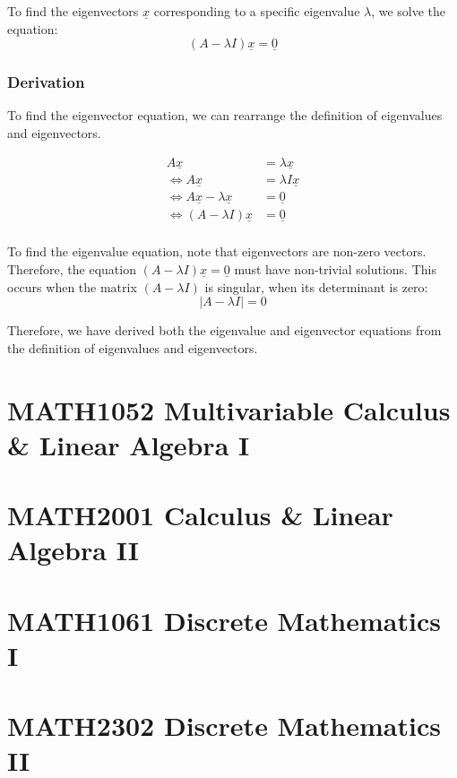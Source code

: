 \documentclass[12pt, letterpaper]{book}
\begin{document}
To find the eigenvectors $\underline{x}$ corresponding to a specific eigenvalue $\lambda$, we solve the equation:
$$(A - \lambda I) \underline{x} = \underline{0}$$

\section{Derivation}

To find the eigenvector equation, we can rearrange the definition of eigenvalues and eigenvectors. 

$$
\begin{aligned}
A \underline{x} &= \lambda \underline{x} \\
\iff A \underline{x} &= \lambda I \underline{x} \\
\iff A \underline{x} - \lambda \underline{x} &= \underline{0} \\
\iff (A - \lambda I) \underline{x} &= \underline{0} \\
\end{aligned}
$$

To find the eigenvalue equation, note that eigenvectors are non-zero vectors. Therefore, the equation $(A - \lambda I) \underline{x} = \underline{0}$ must have non-trivial solutions. This occurs when the matrix $(A - \lambda I)$ is singular, when its determinant is zero:
$$|A - \lambda I| = 0$$

Therefore, we have derived both the eigenvalue and eigenvector equations from the definition of eigenvalues and eigenvectors.

\part{MATH1052 Multivariable Calculus \& Linear Algebra I}

\part{MATH2001 Calculus \& Linear Algebra II}

\part{MATH1061 Discrete Mathematics I}

\part{MATH2302 Discrete Mathematics II}
\end{document}
